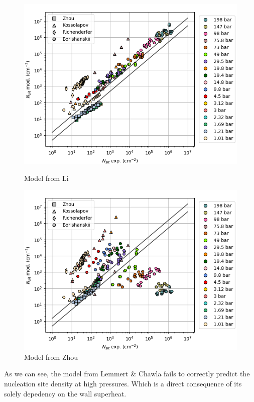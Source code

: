 \begin{figure}[h!]
\begin{multicols}{2}
\includegraphics[width=1.0\linewidth]{img/NSD/Li_rtheta.png}
\caption{Model from Li \etal }

\includegraphics[width=1.0\linewidth]{img/NSD/Zhou_rtheta.png}
\caption{Model from Zhou \etal}
\end{multicols}
\end{figure}


As we can see, the model from Lemmert \& Chawla fails to correctly predict the nucleation site density at high pressures. Which is a direct consequence of its solely depedency on the wall superheat.

